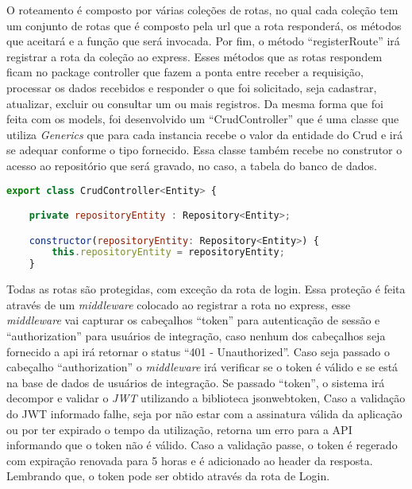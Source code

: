 O roteamento é composto por várias coleções de rotas, no qual cada coleção tem um conjunto de rotas que é composto pela url que a rota responderá, os métodos que aceitará e a função que será invocada.
Por fim, o método ``registerRoute'' irá registrar a rota da coleção ao express.
Esses métodos que as rotas respondem ficam no package controller que fazem a ponta entre receber a requisição, processar os dados recebidos e responder o que foi solicitado, seja cadastrar, atualizar, excluir ou consultar um ou mais registros.
Da mesma forma que foi feita com os models, foi desenvolvido um ``CrudController'' que é uma classe que utiliza \textit{Generics} que para cada instancia recebe o valor da entidade do Crud e irá se adequar conforme o tipo fornecido. Essa classe também recebe no construtor o acesso ao repositório que será gravado, no caso, a tabela do banco de dados.

\begin{lstlisting}[language=JavaScript, caption={CrudController}]
export class CrudController<Entity> {

	private repositoryEntity : Repository<Entity>;

	constructor(repositoryEntity: Repository<Entity>) {
		this.repositoryEntity = repositoryEntity;
	}
\end{lstlisting}
Todas as rotas são protegidas, com exceção da rota de login. Essa proteção é feita através de um \textit{middleware} colocado ao registrar a rota no express, esse \textit{middleware} vai capturar os cabeçalhos ``token'' para autenticação de sessão e ``authorization'' para usuários de integração, caso nenhum dos cabeçalhos seja fornecido a api irá retornar o status ``401 - Unauthorized''. Caso seja passado o cabeçalho ``authorization'' o \textit{middleware} irá verificar se o token é válido e se está na base de dados de usuários de integração. Se passado ``token'', o sistema irá decompor e validar o \textit{JWT} utilizando a biblioteca jsonwebtoken, Caso a validação do JWT informado falhe, seja por não estar com a assinatura válida da aplicação ou por ter expirado o tempo da utilização, retorna um erro para a API informando que o token não é válido. Caso a validação passe, o token é regerado com expiração renovada para 5 horas e é adicionado ao header da resposta. Lembrando que, o token pode ser obtido através da rota de Login.


